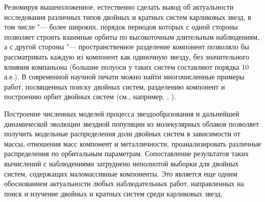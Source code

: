 Резюмируя вышеизложенное, естественно сделать вывод об актуальности исследования различных типов двойных и кратных систем карликовых звезд, в том числе "--- более широких, порядок периодов которых с одной стороны позволяет строить взаимные орбиты по высокоточным длительным наблюдениям, а с другой стороны "--- пространственное разделение компонент позволяло бы рассматривать каждую из компонент как одиночную звезду, без значительного влияния компаньона (большие полуоси у таких систем составляют порядка 10 а.е.). В современной научной печати можно найти многочисленные примеры работ, посвященных поиску двойных систем, разделению компонент и построению орбит двойных систем  (см., например, \cite{2015csss...18..805C}, \cite{2016ApJ...819...17O}).  

Построение численных моделей процесса звездообразования и дальнейшей динамической эволюции звездной популяции из молекулярных облаков позволяет получить модельные распределения доли двойных систем в зависимости от массы, отношения масс компонент и металличности, проанализировать различные распределения по орбитальным параметрам. Сопоставление результатов таких вычислений с наблюдениями затруднено неполнотой выборки для двойных систем, содержащих маломассивные компоненты. Это является еще одним обоснованием актуальности любых наблюдательных работ, направленных на поиск и изучение двойных и кратных систем среди карликовых звезд.

